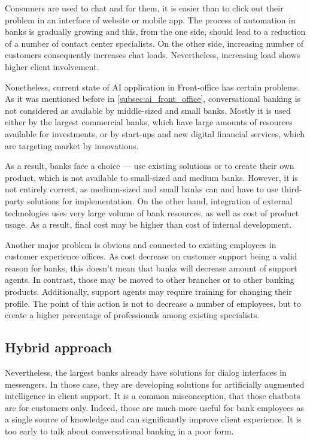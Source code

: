 Consumers are used to chat and for them, it is easier than to click out their problem in an interface of website or mobile app.
The process of automation in banks is gradually growing and this, from the one side, should lead to a reduction of a number of contact center specialists.
On the other side, increasing number of customers consequently increases chat loads.
Nevertheless, increasing load shows higher client involvement.

Nonetheless, current state of AI application in Front-office has certain problems.
As it was mentioned before in \ref{subsec:ai_front_office}, conversational banking is not considered as available by middle-sized and small banks.
Mostly it is used either by the largest commercial banks, which have large amounts of resources available for investments, or by start-ups and new digital financial services, which are targeting market by innovations.

As a result, banks face a choice — use existing solutions or to create their own product, which is not available to small-sized and medium banks.
However, it is not entirely correct, as medium-sized and small banks can and have to use third-party solutions for implementation.
On the other hand, integration of external technologies uses very large volume of bank resources, as well as cost of product usage.
As a result, final cost may be higher than cost of internal development.

Another major problem is obvious and connected to existing employees in customer experience offices.
As cost decrease on customer support being a valid reason for banks, this doesn't mean that banks will decrease amount of support agents.
In contrast, those may be moved to other branches or to other banking products.
Additionally, support agents may require training for changing their profile.
The point of this action is not to decrease a number of employees, but to create a higher percentage of professionals among existing specialists.

\subsection{Hybrid approach}

Nevertheless, the largest banks already have solutions for dialog interfaces in messengers.
In those case, they are developing solutions for artificially augmented intelligence in client support.
It is a common misconception, that those chatbots are for customers only.
Indeed, those are much more useful for bank employees as a single source of knowledge and can significantly improve client experience.
It is too early to talk about conversational banking in a poor form.

